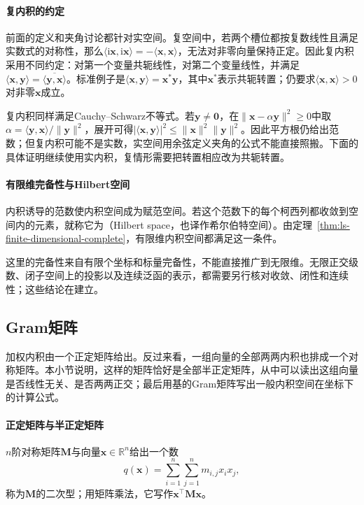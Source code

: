 \paragraph{复内积的约定}
前面的定义和夹角讨论都针对实空间。复空间中，若两个槽位都按复数线性且满足实数式的对称性，那么$\langle\mathrm i\bm x,\mathrm i\bm x\rangle=-\langle\bm x,\bm x\rangle$，无法对非零向量保持正定。因此复内积采用不同约定：对第一个变量共轭线性，对第二个变量线性，并满足$\langle\bm x,\bm y\rangle=\overline{\langle\bm y,\bm x\rangle}$。标准例子是$\langle\bm x,\bm y\rangle=\bm x^*\bm y$，其中$\bm x^*$表示共轭转置；仍要求$\langle\bm x,\bm x\rangle>0$对非零$\bm x$成立。

复内积同样满足Cauchy--Schwarz不等式。若$\bm y\ne\bm0$，在$\|\bm x-\alpha\bm y\|^2\geq0$中取$\alpha=\langle\bm y,\bm x\rangle/\|\bm y\|^2$，展开可得$|\langle\bm x,\bm y\rangle|^2\leq\|\bm x\|^2\|\bm y\|^2$。因此平方根仍给出范数；但复内积可能不是实数，实空间用余弦定义夹角的公式不能直接照搬。下面的具体证明继续使用实内积，复情形需要把转置相应改为共轭转置。

\paragraph{有限维完备性与Hilbert空间}
\label{sec:ls-hilbert-spaces}
内积诱导的范数使内积空间成为赋范空间。若这个范数下的每个柯西列都收敛到空间内的元素，就称它为（Hilbert space，也译作希尔伯特空间）。由定理~\ref{thm:ls-finite-dimensional-complete}，有限维内积空间都满足这一条件。

这里的完备性来自有限个坐标和标量完备性，不能直接推广到无限维。无限正交级数、闭子空间上的投影以及连续泛函的表示，都需要另行核对收敛、闭性和连续性；这些结论在建立。

\subsection{Gram矩阵}
\label{sec:ls-gram-psd}

加权内积由一个正定矩阵给出。反过来看，一组向量的全部两两内积也排成一个对称矩阵。本小节说明，这样的矩阵恰好是全部半正定矩阵，从中可以读出这组向量是否线性无关、是否两两正交；最后用基的Gram矩阵写出一般内积空间在坐标下的计算公式。

\paragraph{正定矩阵与半正定矩阵}
$n$阶对称矩阵$\bm M$与向量$\bm x\in\mathbb R^n$给出一个数
\[
 q(\bm x)=\sum_{i=1}^n\sum_{j=1}^n m_{i,j}x_ix_j,
\]
称为$\bm M$的二次型；用矩阵乘法，它写作$\bm x^\top\bm M\bm x$。

